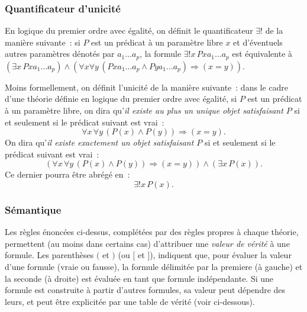 \subsubsection{Quantificateur d'unicité}

En logique du premier ordre avec égalité, on définit le quantificateur $\exists !$ de la manière suivante : si $P$ est un prédicat à un paramètre libre $x$ et d'éventuels autres paramètres dénotés par $a_1 \dots a_p$, la formule $\exists ! x \, P x a_1 \dots a_p$ est équivalente à $(\exists x \, P x a_1 \dots a_p) \wedge (\forall x \forall y \, (P x a_1 \dots a_p \wedge P y a_1 \dots a_p) \Rightarrow (x=y))$.
    
Moins formellement, on définit l'unicité de la manière suivante : dans le cadre d'une théorie définie en logique du premier ordre avec égalité, si $P$ est un prédicat à un paramètre libre, on dira qu'\textit{il existe au plus un unique objet satisfaisant $P$} si et seulement si le prédicat suivant est vrai : 
\begin{equation*}
    \forall x \, \forall y \, (P(x) \wedge P(y)) \Rightarrow (x = y).
\end{equation*}
On dira qu'\textit{il existe exactement un objet satisfaisant $P$} si et seulement si le prédicat suivant est vrai :
\begin{equation*}
    (\forall x \, \forall y \, (P(x) \wedge P(y)) \Rightarrow (x = y)) \wedge (\exists x \, P(x)).
\end{equation*}
Ce dernier pourra être abrégé en : 
\begin{equation*}
    \exists! x \, P(x).
\end{equation*}

\subsubsection{Sémantique}

Les règles énoncées ci-dessus, complétées par des règles propres à chaque théorie, permettent (au moins dans certains cas) d'attribuer une \textit{valeur de vérité} à une formule. Les parenthèses $($ et $)$ (ou $[$ et $]$), indiquent que, pour évaluer la valeur d'une formule (vraie ou fausse), la formule délimitée par la premiere (à gauche) et la seconde (à droite) est évaluée en tant que formule indépendante. 
Si une formule est construite à partir d'autres formules, sa valeur peut dépendre des leurs, et peut être explicitée par une table de vérité (voir ci-dessous). 

